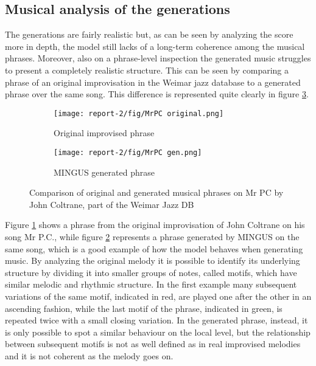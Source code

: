 \documentclass{article}
\begin{document}
\subsection{Musical analysis of the generations}
The generations are fairly realistic but, as can be seen by analyzing the score more in depth, the model still lacks of a long-term coherence among the musical phrases. Moreover, also on a phrase-level inspection the generated music struggles to present a completely realistic structure. This can be seen by comparing a phrase of an original improvisation in the Weimar jazz database to a generated phrase over the same song. This difference is represented quite clearly in figure \ref{fig:mr PC}.

\begin{figure}[htbp]
    \centering
     \begin{subfigure}[b]{0.9\textwidth}
         \centering
         \texttt{[image: report-2/fig/MrPC original.png]}
         \caption{Original improvised phrase}
         \label{fig:mrPc original}
     \end{subfigure}
     \hfill
     \begin{subfigure}[b]{0.9\textwidth}
         \centering
         \texttt{[image: report-2/fig/MrPC gen.png]}
         \caption{MINGUS generated phrase}
         \label{fig:mr PC generated}
     \end{subfigure}
	\caption{Comparison of original and generated musical phrases on Mr PC by John Coltrane, part of the Weimar Jazz DB}
	\label{fig:mr PC}
\end{figure}

Figure \ref{fig:mrPc original} shows a phrase from the original improvisation of John Coltrane on his song Mr P.C., while figure \ref{fig:mr PC generated} represents a phrase generated by MINGUS on the same song, which is a good example of how the model behaves when generating music.
By analyzing the original melody it is possible to identify its underlying structure by dividing it into smaller groups of notes, called motifs, which have similar melodic and rhythmic structure. In the first example many subsequent variations of the same motif, indicated in red, are played one after the other in an ascending fashion, while the last motif of the phrase, indicated in green, is repeated twice with a small closing variation. In the generated phrase, instead, it is only possible to spot a similar behaviour on the local level, but the relationship between subsequent motifs is not as well defined as in real improvised melodies and it is not coherent as the melody goes on. 
\end{document}
